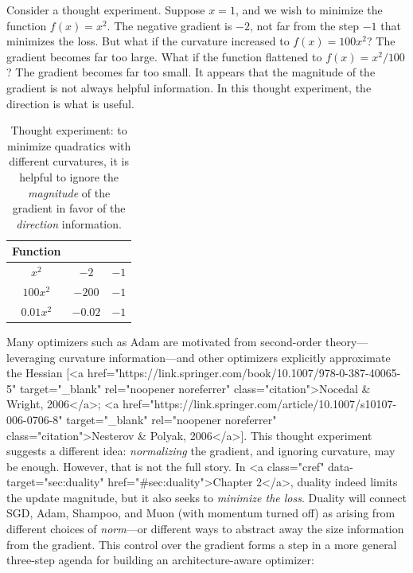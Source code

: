 \vspace{0.5em}

Consider a thought experiment. Suppose $x = 1$, and we wish to minimize the function $f(x) = x^2$. The negative gradient is $-2$, not far from the step $-1$ that minimizes the loss. But what if the curvature increased to $f(x) = 100x^2$? The gradient becomes far too large. What if the function flattened to $f(x) = x^2/100$? The gradient becomes far too small. It appears that the magnitude of the gradient is not always helpful information. In this thought experiment, the direction is what is useful.

\begin{table}[H]
  \centering
  \begin{tabular}{ccc}
    \textbf{Function} & \text{\textbf{Negative Gradient}} & \text{\textbf{Optimal Step}} \\
    \midrule[\heavyrulewidth]
    $x^2$ & $-2$ & $-1$ \\
    $100x^2$ & $-200$ & $-1$ \\
    $0.01x^2$ & $-0.02$ & $-1$
  \end{tabular}
  \caption{Thought experiment: to minimize quadratics with different curvatures, it is helpful to ignore the \textit{magnitude} of the gradient in favor of the \textit{direction} information.}
  \label{tab:gradient-thought-experiment}
\end{table}

Many optimizers such as Adam are motivated from second-order theory---leveraging curvature information---and other optimizers explicitly approximate the Hessian [<a href="https://link.springer.com/book/10.1007/978-0-387-40065-5" target="_blank" rel="noopener noreferrer" class="citation">Nocedal & Wright, 2006</a>; <a href="https://link.springer.com/article/10.1007/s10107-006-0706-8" target="_blank" rel="noopener noreferrer" class="citation">Nesterov & Polyak, 2006</a>]. This thought experiment suggests a different idea: \textit{normalizing} the gradient, and ignoring curvature, may be enough. However, that is not the full story. In <a class="cref" data-target="sec:duality" href="#sec:duality">Chapter 2</a>, duality indeed limits the update magnitude, but it also seeks to \textit{minimize the loss}. Duality will connect SGD, Adam, Shampoo, and Muon (with momentum turned off) as arising from different choices of \textit{norm}---or different ways to abstract away the size information from the gradient. This control over the gradient forms a step in a more general three-step agenda for building an architecture-aware optimizer:


